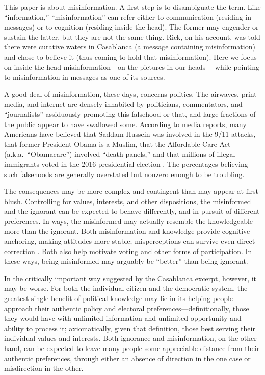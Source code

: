 \documentclass[11pt]{article}
\begin{document}
This paper is about misinformation. A first step is to disambiguate the term. Like ``information,'' ``misinformation'' can refer either to communication (residing in messages) or to cognition (residing inside the head). The former may engender or sustain the latter, but they are not the same thing. Rick, on his account, was told there were curative waters in Casablanca (a message containing misinformation) and chose to believe it (thus coming to hold that misinformation). Here we focus on inside-the-head misinformation---on the pictures in our heads \citep{lippmann1922}---while pointing to misinformation in messages as one of its sources.

A good deal of misinformation, these days, concerns politics. The airwaves, print media, and internet are densely inhabited by politicians, commentators, and ``journalists'' assiduously promoting this falsehood or that, and large fractions of the public appear to have swallowed some. According to media reports, many Americans have believed that Saddam Hussein was involved in the 9/11 attacks, that former President Obama is a Muslim, that the Affordable Care Act (a.k.a.\ ``Obamacare'') involved ``death panels,'' and that millions of illegal immigrants voted in the 2016 presidential election \citep{kull2003, pew2009, pew2010, nyhan2010a, frankovic2016}. The percentages believing such falsehoods are generally overstated \citep[see][and below]{luskin2018} but nonzero enough to be troubling.

The consequences may be more complex and contingent than may appear at first blush. Controlling for values, interests, and other dispositions, the misinformed and the ignorant can be expected to behave differently, and in pursuit of different preferences. In ways, the misinformed may actually resemble the knowledgeable more than the ignorant. Both misinformation and knowledge provide cognitive anchoring, making attitudes more stable; misperceptions can survive even direct correction \citep{nyhan2010b}. Both also help motivate voting and other forms of participation. In these ways, being misinformed may arguably be ``better'' than being ignorant.

In the critically important way suggested by the Casablanca excerpt, however, it may be worse. For both the individual citizen and the democratic system, the greatest single benefit of political knowledge may lie in its helping people approach their authentic policy and electoral preferences---definitionally, those they would have with unlimited information and unlimited opportunity and ability to process it; axiomatically, given that definition, those best serving their individual values and interests. Both ignorance and misinformation, on the other hand, can be expected to leave many people some appreciable distance from their authentic preferences, through either an absence of direction in the one case or misdirection in the other.
\end{document}
